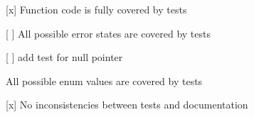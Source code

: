 {\ttfamily }

{\ttfamily 
\begin{DoxyItemize}
\item \mbox{[}x\mbox{]} Function code is fully covered by tests
\item \mbox{[} \mbox{]} All possible error states are covered by tests
\begin{DoxyItemize}
\item \mbox{[} \mbox{]} add test for null pointer
\end{DoxyItemize}
\item All possible enum values are covered by tests
\item \mbox{[}x\mbox{]} No inconsistencies between tests and documentation
\end{DoxyItemize}}

{\ttfamily }

{\ttfamily  }

{\ttfamily }